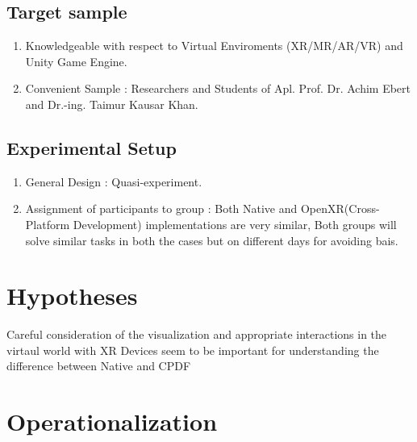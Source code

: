 \documentclass{article}
\begin{document}
\subsection{Target sample}
\begin{enumerate}[label=\textbf{\alph*}]
  \item Knowledgeable with respect to Virtual Enviroments (XR/MR/AR/VR) and Unity Game Engine.
  \item Convenient Sample : Researchers and Students of Apl. Prof. Dr. Achim Ebert and Dr.-ing. Taimur Kausar Khan.
\end{enumerate}

\subsection{Experimental Setup}
\begin{enumerate}[label=\textbf{\alph*}]
  \item General Design : Quasi-experiment.
  \item Assignment of participants to group : Both Native and OpenXR(Cross-Platform Development) implementations are very similar, Both groups will solve similar tasks in both the cases but on different days for avoiding bais.
\end{enumerate}

\section{Hypotheses}
Careful consideration of the visualization and appropriate interactions in the virtaul world with XR Devices seem to be important for understanding the difference between Native and CPDF

\section{Operationalization}

% 
% 
\end{document}
